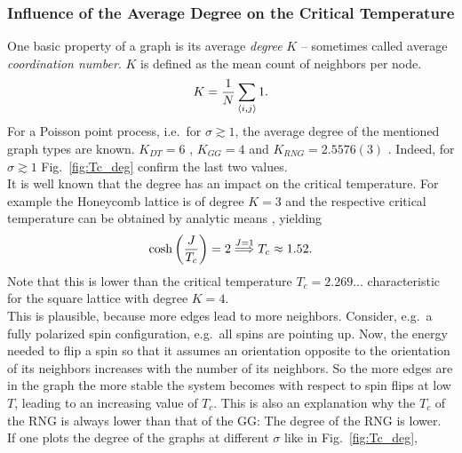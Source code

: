    \subsubsection{Influence of the Average Degree on the Critical Temperature}
        One basic property of a graph is its average \emph{degree} \(K\) -- sometimes
        called average \emph{coordination number}. \(K\) is defined as the mean count
        of neighbors per node.
        \begin{equation}
            K = \frac{1}{N} \sum_{\left< i,j \right>} 1.
            \label{eq:degree}
        \end{equation}
        For a Poisson point process, i.e.\ for \(\sigma \gtrsim 1\),
        the average degree of the mentioned graph types are known.
        \(K_{DT} = 6\) \cite{DelaunayDegree}, \(K_{GG} = 4\) \cite{notPChristoph} and \(K_{RNG} = 2.5576(3)\) \cite{RNGCell}.
        Indeed, for \(\sigma \gtrsim 1\) Fig.\ \ref{fig:Tc_deg}
        confirm the last two values.\\
        It is well known that the degree has an impact on the critical temperature.
        For example the Honeycomb lattice is of degree \(K=3\) and the
        respective critical temperature can be obtained by analytic means \cite{Wannier1945},
        yielding
        \begin{equation}
            \cosh\left(\frac{J}{T_c}\right)=2 \overset{J=1}{\Longrightarrow} T_c \approx 1.52.
            \label{eq:exactHCTc}
        \end{equation}
        Note that this is lower than the critical temperature \(T_c = 2.269...\)
        characteristic for the square lattice with degree \(K=4\).\\
        This is plausible, because more edges lead to more neighbors.
        Consider, e.g.\ a fully polarized spin configuration, e.g.\ all
        spins are pointing up. Now, the energy needed to flip a spin so
        that it assumes an orientation opposite to the orientation of its
        neighbors increases with the number of its neighbors. So the more edges are in
        the graph the more stable the system becomes with respect to spin flips
        at low \(T\), leading to an increasing value of \(T_c\).
        This is also an explanation why the \(T_c\) of the RNG is always
        lower than that of the GG: The degree of the RNG is lower.\\
        If one plots the degree of the graphs at different \(\sigma\) like
        in Fig.\ \ref{fig:Tc_deg},
